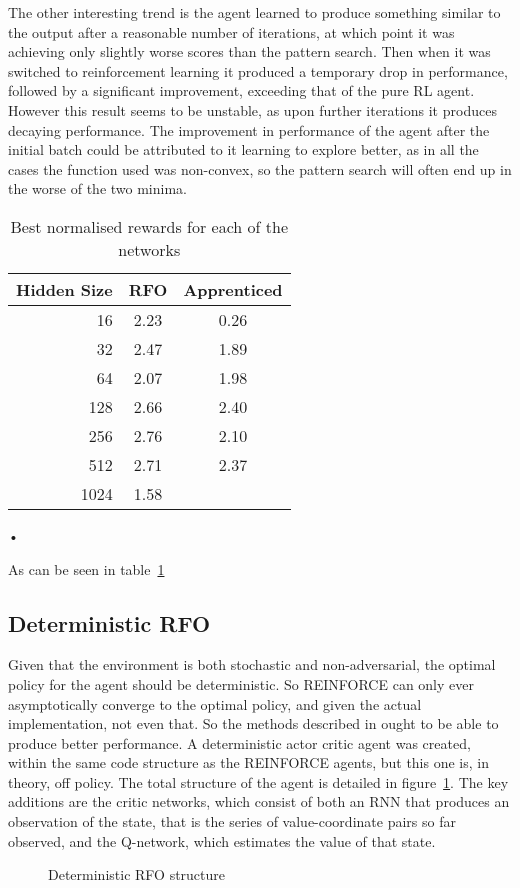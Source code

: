 The other interesting trend is the agent learned to produce something similar to the output after a reasonable number of iterations, at which point it was achieving only slightly worse scores than the pattern search. Then when it was switched to reinforcement learning it produced a temporary drop in performance, followed by a significant improvement, exceeding that of the pure RL agent. However this result seems to be unstable, as upon further iterations it produces decaying performance. The improvement in performance of the agent after the initial batch could be attributed to it learning to explore better, as in all the cases the function used was non-convex, so the pattern search will often end up in the worse of the two minima.

\begin{table}[hbtp]
\centering
\begin{tabular}{r | cc}
Hidden Size & RFO & Apprenticed \\
\hline
16 & 2.23 & 0.26 \\
32 & 2.47 & 1.89 \\
64 & 2.07 & 1.98\\
128 & 2.66 & 2.40 \\
256 & 2.76 & 2.10 \\
512 & 2.71 & 2.37 \\
1024 & 1.58 & \\

\end{tabular}


\caption{Best normalised rewards for each of the networks}
\label{tab:compare}

\end{table}•

As can be seen in table~\ref{tab:compare}

\subsection{Deterministic RFO}
\label{sec:detrfo}
Given that the environment is both stochastic and non-adversarial, the optimal policy for the agent should be deterministic. So REINFORCE can only ever asymptotically converge to the optimal policy, and given the actual implementation, not even that. So the methods described in \cite{lillicrap2015continuous} ought to be able to produce better performance. A deterministic actor critic agent was created, within the same code structure as the REINFORCE agents, but this one is, in theory, off policy. The total structure of the agent is detailed in figure~\ref{fig:detrfo}. The key additions are the critic networks, which consist of both an RNN that produces an observation of the state, that is the series of value-coordinate pairs so far observed, and the Q-network, which estimates the value of that state.
\begin{figure}
\centering

\caption{Deterministic RFO structure}
\label{fig:detrfo}
\end{figure}

